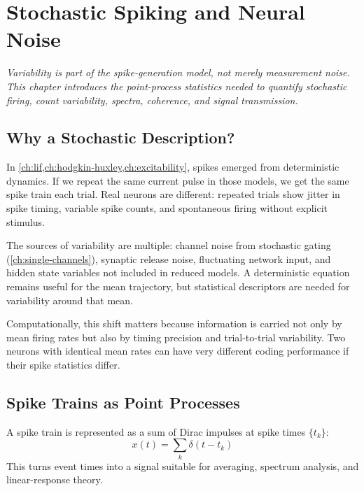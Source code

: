 \chapter{Stochastic Spiking and Neural Noise}
\label{ch:stochastic-spiking}

\textit{Variability is part of the spike-generation model, not merely measurement noise. This chapter introduces the point-process statistics needed to quantify stochastic firing, count variability, spectra, coherence, and signal transmission.}

\section{Why a Stochastic Description?}
\label{sec:why-stochastic}

In \cref{ch:lif,ch:hodgkin-huxley,ch:excitability}, spikes emerged from deterministic dynamics. If we repeat the same current pulse in those models, we get the same spike train each trial. Real neurons are different: repeated trials show jitter in spike timing, variable spike counts, and spontaneous firing without explicit stimulus.

The sources of variability are multiple: channel noise from stochastic gating (\cref{ch:single-channels}), synaptic release noise, fluctuating network input, and hidden state variables not included in reduced models. A deterministic equation remains useful for the mean trajectory, but statistical descriptors are needed for variability around that mean.

Computationally, this shift matters because information is carried not only by mean firing rates but also by timing precision and trial-to-trial variability. Two neurons with identical mean rates can have very different coding performance if their spike statistics differ.

\section{Spike Trains as Point Processes}
\label{sec:point-process}

A spike train is represented as a sum of Dirac impulses at spike times $\{t_k\}$:
%
\begin{equation}
  x(t) = \sum_k \delta(t - t_k)
  \label{eq:spike-train-delta}
\end{equation}
%
This turns event times into a signal suitable for averaging, spectrum analysis, and linear-response theory.


